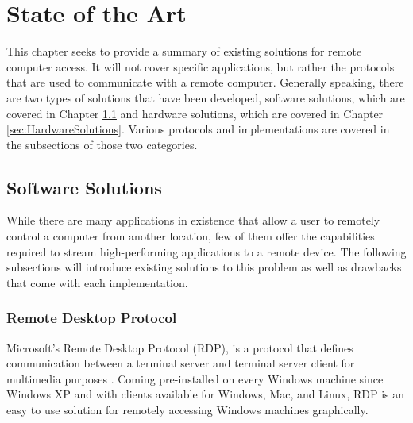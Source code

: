 \chapter{State of the Art} %

\label{Chapter3} %

This chapter seeks to provide a summary of existing solutions for remote computer access.
It will not cover specific applications, but rather the protocols that are used to communicate with a remote computer.
Generally speaking, there are two types of solutions that have been developed, software solutions, which are covered in Chapter \ref{sec:SoftwareSolutions} and hardware solutions, which are covered in Chapter \ref{sec:HardwareSolutions}.
Various protocols and implementations are covered in the subsections of those two categories.

\section{Software Solutions}\label{sec:SoftwareSolutions}

While there are many applications in existence that allow a user to remotely control a computer from another location, few of them offer the capabilities required to stream high-performing applications to a remote device.
The following subsections will introduce existing solutions to this problem as well as drawbacks that come with each implementation.


\subsection{Remote Desktop Protocol}\label{subsec:RemoteDesktopProtocol}

Microsoft's Remote Desktop Protocol (RDP), is a protocol that defines communication between a terminal server and terminal server client for multimedia purposes \cite{rdpDocs}.
Coming pre-installed on every Windows machine since Windows XP and with clients available for Windows, Mac, and Linux, RDP is an easy to use solution for remotely accessing Windows machines graphically.

